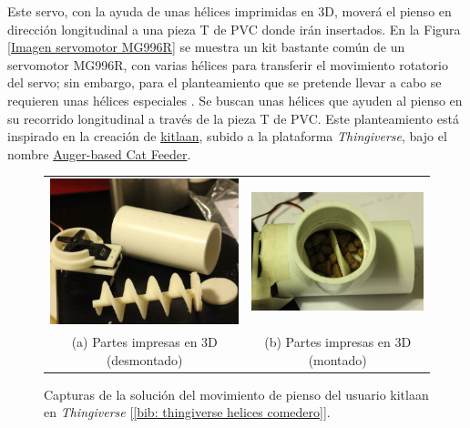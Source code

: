 \documentclass[12pt]{article}
\begin{document}
	\noindent Este servo, con la ayuda de unas hélices imprimidas en 3D, moverá el pienso en dirección longitudinal a una pieza T de PVC donde irán insertados. En la Figura \ref{Imagen servomotor MG996R} se muestra un kit bastante común de un servomotor MG996R, con varias hélices para transferir el movimiento rotatorio del servo; sin embargo, para el planteamiento que se pretende llevar a cabo se requieren unas hélices especiales . Se buscan unas hélices que ayuden al pienso en su recorrido longitudinal a través de la pieza T de PVC. Este planteamiento está inspirado en la creación de \href{https://www.thingiverse.com/kitlaan/designs}{kitlaan}, subido a la plataforma  \textit{Thingiverse}, bajo el nombre \href{https://www.thingiverse.com/thing:27854}{Auger-based Cat Feeder}.  \\
	
	\pagebreak
	
	\begin{figure}[h]
		\begin{center}
			\begin{tabular}{cc}
				\includegraphics[width=60mm]{img/thingiverse_helice_1.png} &   \includegraphics[width=60mm]{img/thingiverse_helice_2.png} \\
				(a) Partes impresas en 3D (desmontado) & (b) Partes impresas en 3D (montado)\\[6pt]
			\end{tabular}
			\caption{Capturas de la solución del movimiento de pienso del usuario kitlaan en \textit{Thingiverse} [\ref{bib: thingiverse helices comedero}].}
			\label{fig: capturas thingiverse helices kitlaan.}
		\end{center}
	\end{figure}
	
\end{document}
